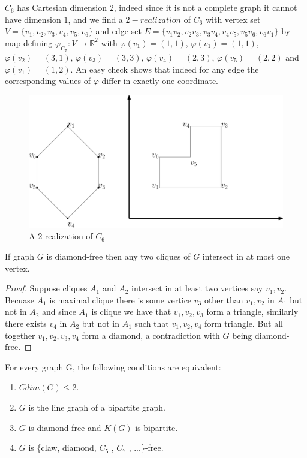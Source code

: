 \documentclass[12pt,a4paper,titlepage,openany]{report}
\begin{document}
\begin{example}
$C_6$ has Cartesian dimension $2$, indeed since it is not a complete graph it cannot have dimension $1$, and we find a $2-realization$ of $C_6$ with vertex set $V=\{v_1,v_2,v_3,v_4,v_5,v_6\}$ and edge set $E=\{v_1v_2,v_2v_3,v_3v_4,v_4v_5,v_5v_6,v_6v_1\}$ by map defining $\varphi_{C_7}:V\rightarrow \mathbb{R}^2$ with $\varphi(v_1)=(1,1)$, $\varphi(v_1)=(1,1)$, $\varphi(v_2)=(3,1)$, $\varphi(v_3)=(3,3)$, $\varphi(v_4)=(2,3)$, $\varphi(v_5)=(2,2)$ and $\varphi(v_1)=(1,2)$. An easy check shows that indeed for any edge the corresponding values of $\varphi$ differ in exactly one coordinate.
\begin{figure}[h]
\begin{center}
\includegraphics[width=1\linewidth]{figures/c_62real.png}
\end{center}
\caption{A $2$-realization of $C_6$}
\end{figure}
\end{example} 

\begin{lemma}\label{diamondfreecliques}
If graph $G$ is diamond-free then any two cliques of $G$ intersect in at most one vertex.
\end{lemma}
\begin{proof}
Suppose cliques $A_1$ and $A_2$ intersect in at least two vertices say $v_1, v_2$. Becuase $A_1$ is maximal clique there is some vertice $v_3$ other than $v_1,v_2$ in $A_1$ but not in $A_2$ and since $A_1$ is clique we have that $v_1,v_2,v_3$ form a triangle, similarly there exists $v_4$ in $A_2$ but not in $A_1$ such that $v_1,v_2,v_4$ form triangle. But all together $v_1,v_2,v_3,v_4$ form a diamond, a contradiction with $G$ being diamond-free.
\end{proof}

\begin{theorem}
For every graph G, the following conditions are equivalent:
\begin{enumerate}
\item $Cdim(G)\leq 2$.
\item $G$ is the line graph of a bipartite graph.
\item $G$ is diamond-free and $K(G)$ is bipartite.
\item $G$ is \{claw, diamond, $C_5$ , $C_7$ , ...\}-free.
\end{enumerate}
\end{theorem}
\end{document}
